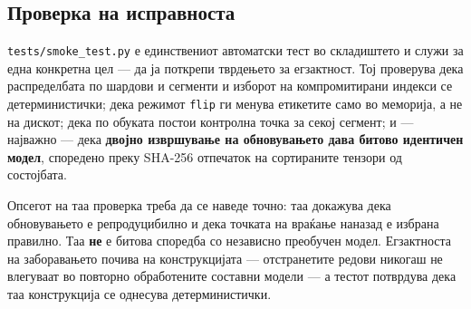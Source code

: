 \subsection{Проверка на исправноста}

\texttt{tests/smoke\_test.py} е единствениот автоматски тест во складиштето и служи за една
конкретна цел --- да ја поткрепи тврдењето за егзактност. Тој проверува дека распределбата по
шардови и сегменти и изборот на компромитирани индекси се детерминистички; дека режимот
\texttt{flip} ги менува етикетите само во меморија, а не на дискот; дека по обуката постои
контролна точка за секој сегмент; и --- најважно --- дека \textbf{двојно извршување на обновувањето
дава битово идентичен модел}, споредено преку SHA-256 отпечаток на сортираните тензори од
состојбата.

Опсегот на таа проверка треба да се наведе точно: таа докажува дека обновувањето е
репродуцибилно и дека точката на враќање наназад е избрана правилно. Таа \textbf{не} е
битова споредба со независно преобучен модел. Егзактноста на заборавањето почива на
конструкцијата --- отстранетите редови никогаш не влегуваат во повторно обработените
составни модели --- а тестот потврдува дека таа конструкција се однесува детерминистички.

